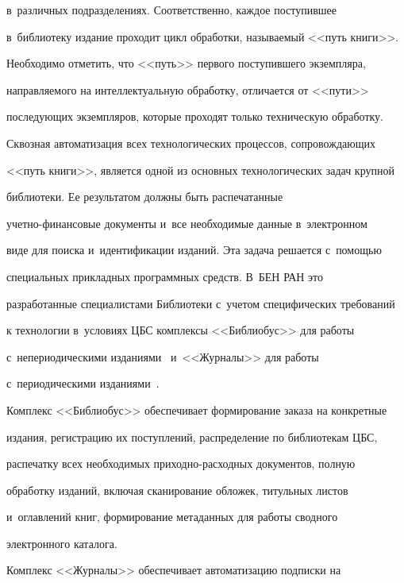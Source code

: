 в~различных подразделениях. Соответственно, каждое поступившее 


в~библиотеку издание проходит цикл обработки, называемый <<путь книги>>. 


Необходимо отметить, что <<путь>> первого поступившего экземпляра, 


направляемого на интеллектуальную обработку, отличается от <<пути>> 


последующих экземпляров, которые проходят только техническую обработку. 


  


  Сквозная автоматизация всех технологических процессов, сопровождающих 


<<путь книги>>, является одной из основных технологических задач крупной 


библиотеки. Ее результатом должны быть распечатанные  


учет\-но-фи\-нан\-со\-вые документы и~все необходимые данные в~электронном 


виде для поиска и~идентификации изданий. Эта задача решается с~помощью 


специальных прикладных программных средств. В~БЕН РАН это 


разработанные специалистами Библиотеки с~учетом специфических требований 


к технологии в~условиях ЦБС комплексы <<Библиобус>> для работы 


с~непериодическими изданиями~\cite{8-vla} и~<<Журналы>> для работы 


с~периодическими изданиями~\cite{9-vla}. 


  


  Комплекс <<Библиобус>> обеспечивает формирование заказа на конкретные 


издания, регистрацию их поступлений, распределение по библиотекам ЦБС, 


распечатку всех необходимых приходно-расходных документов, полную 


обработку изданий, включая сканирование обложек, титульных листов 


и~оглавлений книг, формирование метаданных для работы сводного 


электронного каталога. 


  


  Комплекс <<Журналы>> обеспечивает автоматизацию подписки на 


